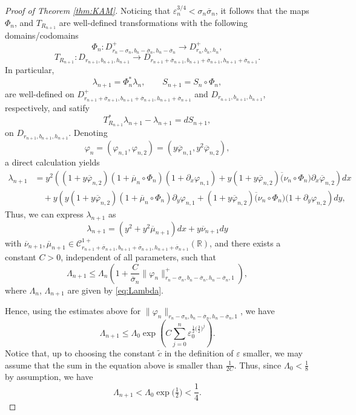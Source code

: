 \documentclass[10pt]{article}
\newcommand{\R}{\mathbb{R}}
\newcommand{\T}{\mathbb{T}}
\newcommand{\Domain}[3]{D_{#1, #2, #3}}
\newcommand{\DomainP}[3]{D_{#1, #2, #3}^+}
\begin{document}
\begin{proof}[Proof of Theorem \ref{thm:KAM}]
Noticing that $\varepsilon_n^{3/4} < \sigma_n \overline \sigma_n$, it follows that the maps $\Phi_n$, and $T_{R_{n + 1}}$ are well-defined transformations with the following domains/codomains
\[ 
\Phi_n: \DomainP{r_n - \sigma_n}{b_n - \overline \sigma_n}{h_n - \overline \sigma_n} \to  \DomainP{r_n}{b_n}{h_n},\]
\[T_{R_{n + 1}}: \Domain{r_{n + 1}}{b_{n + 1}}{h_{n + 1}} \to \Domain{r_{n + 1} + \overline \sigma_{n + 1}}{b_{n + 1} + \overline \sigma_{n + 1}}{h_{n + 1} + \overline \sigma_{n + 1}}.
\]
In particular, 
\[\lambda_{n + 1}= \Phi_n^* \lambda_n,\qquad S_{n + 1}= S_n \circ \Phi_n,\] are well-defined on $\DomainP{r_{n + 1} + \overline \sigma_{n + 1}}{b_{n + 1} + \overline \sigma_{n + 1}}{h_{n + 1} + \overline \sigma_{n + 1}}$ and $\Domain{r_{n + 1}}{b_{n + 1}}{h_{n + 1}}$, respectively, and satify
\[ T_{R_{n + 1}}^* \lambda_{n + 1} - \lambda_{n + 1} = dS_{n + 1}, \]
on $\Domain{r_{n + 1}}{b_{n + 1}}{h_{n + 1}}$. Denoting 
\[\varphi_n =  (\varphi_{n , 1}, \varphi_{n, 2}) = (y \overline \varphi_{n , 1}, y^2 \overline \varphi_{n, 2}),\]
a direct calculation yields
\begin{align*}
    \lambda_{n + 1} & = y^2\left( (1 + y \overline \varphi_{n, 2})(1 + \overline \mu_n \circ \Phi_n)(1 + \partial_x \varphi_{n, 1}) + y(1 + y \overline \varphi_{n, 2})\overline (\nu_n \circ \Phi_n) \partial_x \overline \varphi_{n, 2}\right)dx \\
    & \quad +y\left(y(1 + y \overline \varphi_{n, 2})(1 + \overline \mu_n \circ \Phi_n)\partial_y \varphi_{n, 1} + (1 + y \overline \varphi_{n, 2})\overline (\nu_n \circ \Phi_n) (1 + \partial_y \varphi_{n, 2}\right)dy,
\end{align*}
Thus, we can express $\lambda_{n + 1}$ as 
\[ \lambda_{n + 1} = (y^2 + y^2 \overline \mu_{n + 1}) dx + y \overline \nu_{n + 1} dy\]
with $\overline \nu_{n + 1}, \overline \mu_{n + 1} \in  \mathscr C^{1+}_{r_{n + 1} + \overline \sigma_{n + 1},b_{n + 1} + \overline \sigma_{n + 1},h_{n + 1} + \overline \sigma_{n + 1}}(\R)$, and there exists a constant $C > 0$, independent of all parameters, such that
\[ \Lambda_{n + 1} \leq \Lambda_n\left(1 + \frac{C}{\overline \sigma_n}\|\varphi_{n}\|^+_{r_{n}-\sigma_n,b_{n}-\overline\sigma_n,h_{n}-\overline\sigma_n,1}\right),  \]
where $\Lambda_n$, $\Lambda_{n + 1}$ are given by \eqref{eq:Lambda}. 

Hence, using the estimates above for $\|\varphi_{n}\|_{r_{n}-\sigma_n,b_{n}-\overline\sigma_n,h_{n}-\overline\sigma_n,1}$, we have
\[ \Lambda_{n + 1} \leq \Lambda_0 \exp\left(C \sum_{j = 0}^n \varepsilon_0^{\tfrac{1}{2}\big(\tfrac{3}{2}\big)^j}\right).\]
Notice that, up to choosing the constant $\tilde c$ in the definition of $\varepsilon$ smaller, we may assume that the sum in the equation above is smaller than $\frac{1}{2C}$. Thus, since $\Lambda_0 < \tfrac{1}{8}$ by assumption, we have
\[ \Lambda_{n + 1} < \Lambda_0  \exp\big(\tfrac{1}{2}\big)< \frac{1}{4}.\]


\end{proof}
\end{document}
